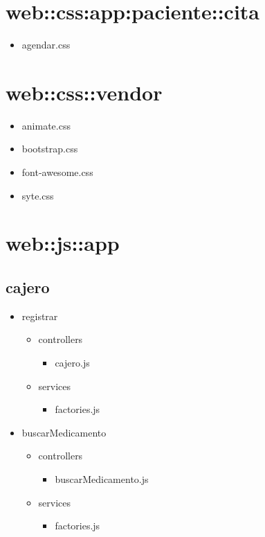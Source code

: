 	\section{web::css:app:paciente::cita}
	\begin{itemize}
	\item agendar.css
	\end{itemize}
	
	\section{web::css::vendor}
	\begin{itemize}
	\item animate.css
	\item bootstrap.css
	\item font-awesome.css
	\item syte.css
	
	\end{itemize}
	
	
	
	\newpage
	\section{web::js::app}
	\subsection{cajero}
	\begin{itemize}
		\item registrar
		\begin{itemize}
			\item controllers
			\begin{itemize}
				\item cajero.js
			\end{itemize}
			\item services
			\begin{itemize}
				\item factories.js
			\end{itemize}
		\end{itemize}
		\item buscarMedicamento
		\begin{itemize}
		\item controllers
		\begin{itemize}
		\item buscarMedicamento.js
		\end{itemize}
		\item services
		\begin{itemize}
		\item factories.js
		\end{itemize}
		\end{itemize}
	\end{itemize}
	
